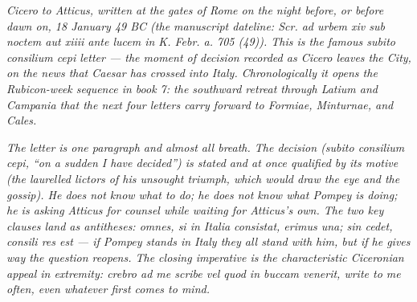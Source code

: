 
\textit{Cicero to Atticus, written at the gates of Rome
on the night before, or before dawn on, 18 January
49 BC (the manuscript dateline:
\textit{Scr. ad urbem xiv sub noctem aut xiiii ante lucem
in K. Febr. a. 705 (49)}). This is the famous
\emph{subito consilium cepi} letter --- the moment of
decision recorded as Cicero leaves the City, on the news
that Caesar has crossed into Italy. Chronologically it
opens the Rubicon-week sequence in book 7: the southward
retreat through Latium and Campania that the next four
letters carry forward to Formiae, Minturnae, and Cales.}

\textit{The letter is one paragraph and almost all
breath. The decision (\emph{subito consilium cepi},
``on a sudden I have decided'') is stated and at once
qualified by its motive (the laurelled lictors of his
unsought triumph, which would draw the eye and the
gossip). He does not know what to do; he does not know
what Pompey is doing; he is asking Atticus for counsel
while waiting for Atticus's own. The two key clauses
land as antitheses: \emph{omnes, si in Italia consistat,
erimus una; sin cedet, consili res est} --- if Pompey
stands in Italy they all stand with him, but if he gives
way the question reopens. The closing imperative is the
characteristic Ciceronian appeal in extremity:
\emph{crebro ad me scribe vel quod in buccam venerit},
write to me often, even whatever first comes to mind.}
